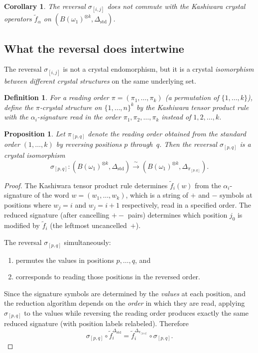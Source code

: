\documentclass[11pt]{article}
\newtheorem{proposition}[theorem]{Proposition}
\newtheorem{corollary}[theorem]{Corollary}
\newtheorem{definition}[theorem]{Definition}
\theoremstyle{remark}
\begin{document}
\begin{corollary}
The reversal $\sigma_{[i,j]}$ does not commute with the Kashiwara
crystal operators $\tilde{f}_\alpha$ on
$(B(\omega_1)^{\otimes k}, \Delta_{\mathrm{std}})$.
\end{corollary}

\subsection{What the reversal does intertwine}

The reversal $\sigma_{[i,j]}$ is not a crystal endomorphism, but it
is a crystal \emph{isomorphism between different crystal structures}
on the same underlying set.

\begin{definition}
For a reading order $\pi = (\pi_1, \ldots, \pi_k)$ (a permutation of
$\{1, \ldots, k\}$), define the $\pi$-crystal structure on
$\{1, \ldots, n\}^k$ by the Kashiwara tensor product rule with
the $\alpha_i$-signature read in the order $\pi_1, \pi_2, \ldots, \pi_k$
instead of $1, 2, \ldots, k$.
\end{definition}

\begin{proposition}\label{prop:intertwine}
Let $\pi_{[p,q]}$ denote the reading order obtained from the standard
order $(1, \ldots, k)$ by reversing positions $p$ through~$q$. Then
the reversal $\sigma_{[p,q]}$ is a crystal isomorphism
\[
  \sigma_{[p,q]}\colon
  (B(\omega_1)^{\otimes k}, \Delta_{\mathrm{std}})
  \xrightarrow{\;\sim\;}
  (B(\omega_1)^{\otimes k}, \Delta_{\pi_{[p,q]}}).
\]
\end{proposition}

\begin{proof}
The Kashiwara tensor product rule determines $\tilde{f}_i(w)$ from the
$\alpha_i$-signature of the word $w = (w_1, \ldots, w_k)$, which is a
string of $+$ and $-$ symbols at positions where $w_j = i$ and
$w_j = i+1$ respectively, read in a specified order. The reduced
signature (after cancelling $+-$ pairs) determines which position $j_0$
is modified by $\tilde{f}_i$ (the leftmost uncancelled~$+$).

The reversal $\sigma_{[p,q]}$ simultaneously:
\begin{enumerate}
  \item permutes the values in positions $p, \ldots, q$, and
  \item corresponds to reading those positions in the reversed order.
\end{enumerate}
Since the signature symbols are determined by the \emph{values} at each
position, and the reduction algorithm depends on the \emph{order} in
which they are read, applying $\sigma_{[p,q]}$ to the values while
reversing the reading order produces exactly the same reduced signature
(with position labels relabeled). Therefore
\[
  \sigma_{[p,q]} \circ \tilde{f}_i^{\Delta_{\mathrm{std}}}
  = \tilde{f}_i^{\Delta_{\pi_{[p,q]}}} \circ \sigma_{[p,q]}.
\]
\end{proof}
\end{document}
